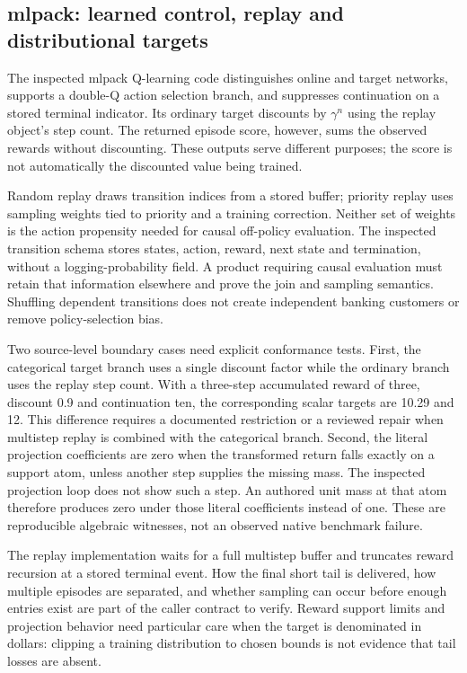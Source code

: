 \subsection{mlpack: learned control, replay and distributional targets}
The inspected mlpack Q-learning code distinguishes online and target networks, supports a double-Q action selection branch, and suppresses continuation on a stored terminal indicator. Its ordinary target discounts by $\gamma^{n}$ using the replay object's step count. The returned episode score, however, sums the observed rewards without discounting. These outputs serve different purposes; the score is not automatically the discounted value being trained.~\citep{exec24_policycxx_mlpack}

Random replay draws transition indices from a stored buffer; priority replay uses sampling weights tied to priority and a training correction. Neither set of weights is the action propensity needed for causal off-policy evaluation. The inspected transition schema stores states, action, reward, next state and termination, without a logging-probability field. A product requiring causal evaluation must retain that information elsewhere and prove the join and sampling semantics. Shuffling dependent transitions does not create independent banking customers or remove policy-selection bias.~\citep{exec24_policycxx_mlpack,exec24_policycxx_comparison}

Two source-level boundary cases need explicit conformance tests. First, the categorical target branch uses a single discount factor while the ordinary branch uses the replay step count. With a three-step accumulated reward of three, discount 0.9 and continuation ten, the corresponding scalar targets are 10.29 and 12. This difference requires a documented restriction or a reviewed repair when multistep replay is combined with the categorical branch. Second, the literal projection coefficients are zero when the transformed return falls exactly on a support atom, unless another step supplies the missing mass. The inspected projection loop does not show such a step. An authored unit mass at that atom therefore produces zero under those literal coefficients instead of one. These are reproducible algebraic witnesses, not an observed native benchmark failure.~\citep{exec24_policycxx_mlpack,exec24_policycxx_comparison}

The replay implementation waits for a full multistep buffer and truncates reward recursion at a stored terminal event. How the final short tail is delivered, how multiple episodes are separated, and whether sampling can occur before enough entries exist are part of the caller contract to verify. Reward support limits and projection behavior need particular care when the target is denominated in dollars: clipping a training distribution to chosen bounds is not evidence that tail losses are absent.~\citep{exec24_policycxx_mlpack,exec24_policycxx_comparison}


